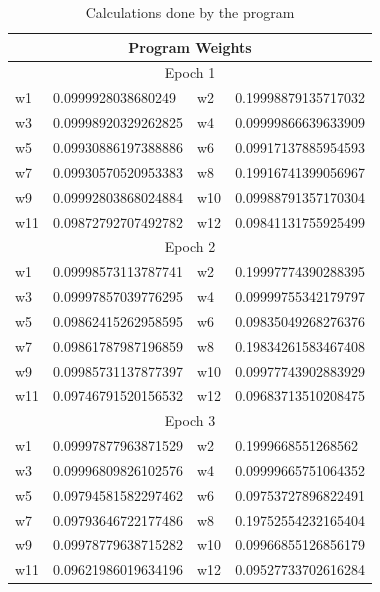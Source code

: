 \documentclass{article}
\begin{document}
\begin{table}[h]
    \centering
    \begin{tabular}{|l|l|l|l|}
        \hline
        \multicolumn{4}{|c|}{\textbf{Program Weights}}        \\ \hline
        \multicolumn{4}{|c|}{{ Epoch 1}}                   \\ \hline
        w1  & 0.0999928038680249  & w2  & 0.19998879135717032 \\ \hline
        w3  & 0.09998920329262825 & w4  & 0.09999866639633909 \\ \hline
        w5  & 0.09930886197388886 & w6  & 0.09917137885954593 \\ \hline
        w7  & 0.09930570520953383 & w8  & 0.19916741399056967 \\ \hline
        w9  & 0.09992803868024884 & w10 & 0.09988791357170304 \\ \hline
        w11 & 0.09872792707492782 & w12 & 0.09841131755925499 \\ \hline
        \multicolumn{4}{|c|}{{ Epoch 2}}                   \\ \hline
        w1  & 0.09998573113787741 & w2  & 0.19997774390288395 \\ \hline
        w3  & 0.09997857039776295 & w4  & 0.09999755342179797 \\ \hline
        w5  & 0.09862415262958595 & w6  & 0.09835049268276376 \\ \hline
        w7  & 0.09861787987196859 & w8  & 0.19834261583467408 \\ \hline
        w9  & 0.09985731137877397 & w10 & 0.09977743902883929 \\ \hline
        w11 & 0.09746791520156532 & w12 & 0.09683713510208475 \\ \hline
        \multicolumn{4}{|c|}{Epoch 3}                         \\ \hline
        w1  & 0.09997877963871529 & w2  & 0.1999668551268562  \\ \hline
        w3  & 0.09996809826102576 & w4  & 0.09999665751064352 \\ \hline
        w5  & 0.09794581582297462 & w6  & 0.09753727896822491 \\ \hline
        w7  & 0.09793646722177486 & w8  & 0.19752554232165404 \\ \hline
        w9  & 0.09978779638715282 & w10 & 0.09966855126856179 \\ \hline
        w11 & 0.09621986019634196 & w12 & 0.09527733702616284 \\ \hline
    \end{tabular}
    \caption{Calculations done by the program}
    \label{programTable}
\end{table}
\end{document}
